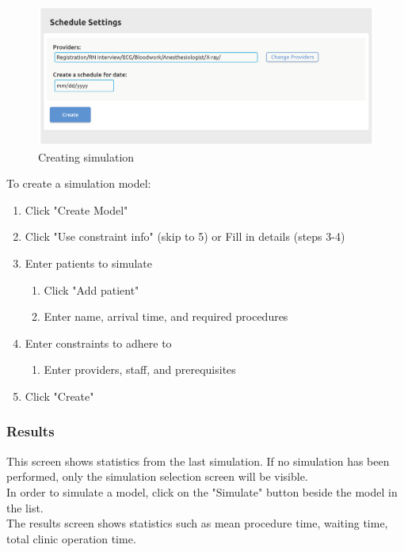 \documentclass[12pt]{article}
\begin{document}
\begin{figure}[H]
\centering
\includegraphics[width=\textwidth]{simsetting}
\caption{Creating simulation}
\end{figure}

To create a simulation model:
\begin{enumerate}
\item Click "Create Model"
\item Click "Use constraint info" (skip to 5) or Fill in details (steps 3-4)
\item Enter patients to simulate
\begin{enumerate}
\item Click "Add patient"
\item Enter name, arrival time, and required procedures
\end{enumerate}
\item Enter constraints to adhere to
\begin{enumerate}
\item Enter providers, staff, and prerequisites
\end{enumerate}
\item Click "Create"
\end{enumerate}

\subsubsection{Results}
This screen shows statistics from the last simulation. If no simulation has been performed, only the simulation selection screen will be visible.\\

In order to simulate a model, click on the "Simulate" button beside the model in the list.\\

The results screen shows statistics such as mean procedure time, waiting time, total clinic operation time. \\
\end{document}
